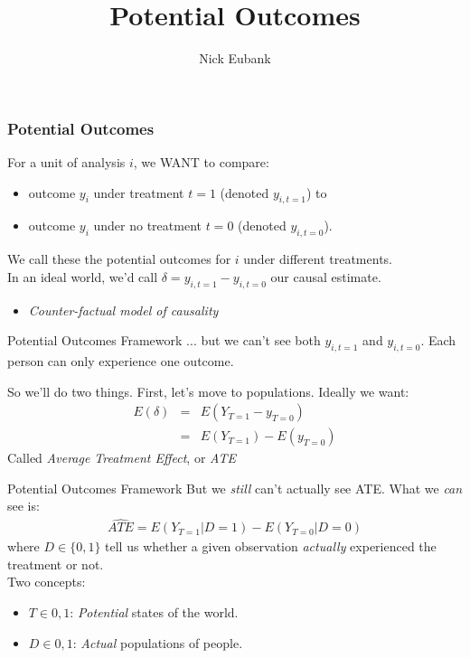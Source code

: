\documentclass[11pt]{beamer}
\title{Potential Outcomes}
\author{\small Nick Eubank}
\date{\vspace*{.3in} \date}
\begin{document}
\begin{frame}[c]
\maketitle
\end{frame}

\begin{frame}
  \frametitle{Potential Outcomes}
\pause For a unit of analysis $i$, we WANT to compare:
\begin{itemize}
  \item outcome $y_i$ under treatment $t=1$ (denoted $y_{i, t=1}$) to
  \item outcome $y_i$ under no treatment $t=0$ (denoted $y_{i, t=0}$).
\end{itemize}
\pause We call these the \alert{potential outcomes} for $i$ under different treatments.\\
\pause In an ideal world, we'd call \alert{$\delta = y_{i, t=1} - y_{i, t=0}$} our causal estimate.
\begin{itemize}
  \pause \item \emph{Counter-factual model of causality}
\end{itemize}
\end{frame}


\begin{frame}[c]{Potential Outcomes Framework}
... but we can't see both $y_{i, t=1}$ and $y_{i, t=0}$. Each person can only experience one outcome.

So we'll do two things. First, let's move to populations. Ideally we want:
\begin{eqnarray}
  E(\delta) &=& E(Y_{T=1} - y_{T=0}) \nonumber \\
             &=& E(Y_{T=1}) - E(y_{T=0}) \nonumber
\end{eqnarray}
\pause Called \emph{Average Treatment Effect}, or \emph{ATE}
\end{frame}

\begin{frame}[c]{Potential Outcomes Framework}
But we \emph{still} can't actually see ATE. What we \emph{can} see is:
\begin{eqnarray}
\widehat{ATE} = E(Y_{T=1}|D=1) - E(Y_{T=0}|D=0) \nonumber
\end{eqnarray}
where $D\in\{0,1\}$ tell us whether a given observation \emph{actually} experienced the treatment or not.\\
\pause
\vspace{0.1cm}
Two concepts:
\begin{itemize}
  \item $T\in{0,1}$: \emph{Potential} states of the world.
  \item $D\in{0,1}$: \emph{Actual} populations of people.
\end{itemize}
\end{frame}
\end{document}
